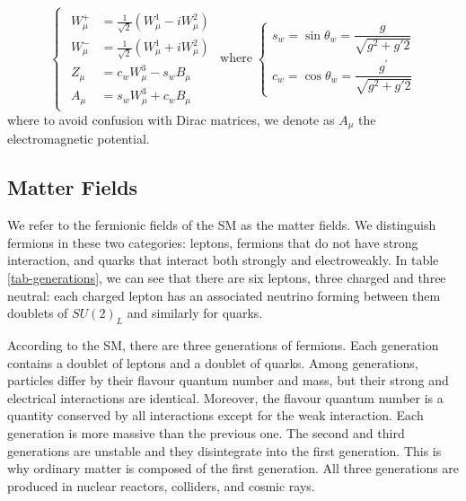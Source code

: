 \begin{equation}
\begin{cases}
	\begin{aligned}
		W_{\mu}^{+} &=\frac{1}{\sqrt{2}}\left(W_{\mu}^{1}-i W_{\mu}^{2}\right) \\
		W_{\mu}^{-} &=\frac{1}{\sqrt{2}}\left(W_{\mu}^{1}+i W_{\mu}^{2}\right) \\
		Z_{\mu} &=c_{w} W_{\mu}^{3}-s_{w} B_{\mu} \\
		A_{\mu} &=s_{w} W_{\mu}^{3}+c_{w} B_{\mu}
	\end{aligned}
\end{cases}
\text{where}
\;
\begin{cases}
	s_{w}=\sin \theta_{w}=\dfrac{g}{\sqrt{g^{2}+g{\prime2}}}\\
	c_{w}=\cos \theta_{w}=\dfrac{g^\prime}{\sqrt{g^{2}+g{\prime2}}}
\end{cases}
\end{equation}
where to avoid confusion with Dirac matrices, we denote as $A_\mu$ the electromagnetic potential.

\subsection{Matter Fields}
We refer to the fermionic fields of the SM as the matter fields. We distinguish fermions in these two categories: leptons, fermions that do not have strong interaction, and quarks that interact both strongly and electroweakly. In table \ref{tab-generations}, we can see that there are six leptons, three charged and three neutral: each charged lepton has an associated neutrino forming between them doublets of $SU(2)_L$ and similarly for quarks. 

According to the SM, there are three generations of fermions. Each generation contains a doublet of leptons and a doublet of quarks. Among generations, particles differ by their flavour quantum number and mass, but their strong and electrical interactions are identical. Moreover, the flavour quantum number is a quantity conserved by all interactions except for the weak interaction.  Each generation is more massive than the previous one. The second and third generations are unstable and they disintegrate into the first generation. This is why ordinary matter is composed of the first generation. All three generations are produced in nuclear reactors, colliders, and cosmic rays. 


